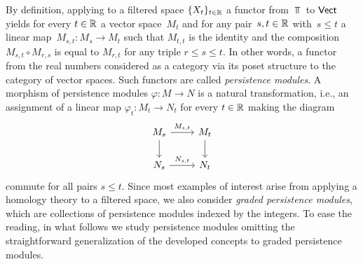 By definition, applying to a filtered space $\{X_t\}_{t \in \mathbb{R}}$ a functor from $\Top$ to $\mathsf{Vect}$ yields for every $t \in \mathbb{R}$ a vector space~$M_t$ and for any pair~$s, t \in \mathbb{R}$ with~$s \leq t$ a linear map~$M_{s,t} \colon M_s \to M_t$ such that $M_{t,t}$ is the identity and the composition $M_{s,t} \circ M_{r,s}$ is equal to $M_{r,t}$ for any triple $r \leq s \leq t$.
In other words, a functor from the real numbers considered as a category via its poset structure to the category of vector spaces.
Such functors are called \emph{persistence modules}.
A morphism of persistence modules $\varphi \colon M \to N$ is a natural transformation, i.e., an assignment of a linear map $\varphi_t \colon M_t \to N_t$ for every $t \in \mathbb{R}$ making the diagram
\begin{equation*}
    \begin{tikzcd}
    M_{s} \arrow[r, "M_{s,t}"] \arrow[d] & M_{t} \arrow[d] \\
    N_{s} \arrow[r, "N_{s,t}"] & N_{t}
    \end{tikzcd}
\end{equation*}
commute for all pairs $s \leq t$.
Since most examples of interest arise from applying a homology theory to a filtered space, we also consider \emph{graded persistence modules}, which are collections of persistence modules indexed by the integers.
To ease the reading, in what follows we study persistence modules omitting the straightforward generalization of the developed concepts to graded persistence modules.

